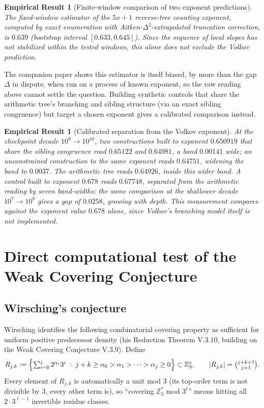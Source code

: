 \documentclass[11pt]{article}
\newtheorem{empirical}[theorem]{Empirical Result}
\theoremstyle{definition}
\theoremstyle{remark}
\begin{document}
\begin{empirical}[Finite-window comparison of two exponent predictions]
\label{thm:kl}
The fixed-window estimator of the $5x+1$ reverse-tree counting
exponent, computed by exact enumeration with
Aitken-$\Delta^2$-extrapolated truncation correction, is $0.639$
(bootstrap interval $[0.633,0.645]$). Since the sequence of local
slopes has not stabilized within the tested windows, this alone does
not exclude the Volkov prediction.
\end{empirical}

The companion paper shows this estimator is itself biased, by more
than the gap $\Delta$ in dispute, when run on a process of known
exponent, so the raw reading above cannot settle the question. Building
synthetic controls that share the arithmetic tree's branching and
sibling structure (via an exact sibling congruence) but target a chosen
exponent gives a calibrated comparison instead.

\begin{empirical}[Calibrated separation from the Volkov exponent]
\label{thm:kl-calibrated}
At the checkpoint decade $10^9\!\to\!10^{10}$, two constructions built
to exponent $0.650919$ that share the sibling congruence read
$0.65122$ and $0.64981$, a band $0.00141$ wide; an unconstrained
construction to the same exponent reads $0.64751$, widening the band
to $0.0037$. The arithmetic tree reads $0.64926$, inside this wider
band. A control built to exponent $0.678$ reads $0.67748$, separated
from the arithmetic reading by seven band-widths; the same comparison
at the shallower decade $10^7\!\to\!10^8$ gives a gap of $0.0258$,
growing with depth. This measurement compares against the exponent
value $0.678$ alone, since Volkov's branching model itself is not
implemented.
\end{empirical}

\section{Direct computational test of the Weak Covering Conjecture}
\label{sec:wcc}

\subsection{Wirsching's conjecture}

Wirsching \cite{Wirsching1998} identifies the following combinatorial
covering property as sufficient for uniform positive predecessor
density (his Reduction Theorem V.3.10, building on the Weak Covering
Conjecture V.3.9). Define
\[
  R_{j,k} := \Bigl\{ \textstyle\sum_{i=0}^j 2^{\alpha_i} 3^i \;:\;
  j+k\ge \alpha_0>\alpha_1>\cdots>\alpha_j\ge 0 \Bigr\} \subset
  \mathbb{Z}_3^\ast, \qquad |R_{j,k}| = \binom{j+k+1}{j+1}.
\]
Every element of $R_{j,k}$ is automatically a unit mod $3$ (its
top-order term is not divisible by $3$, every other term is), so
``covering $\mathbb{Z}_3^\ast$ mod $3^\ell$'' means hitting all
$2\cdot 3^{\ell-1}$ invertible residue classes.
\end{document}

